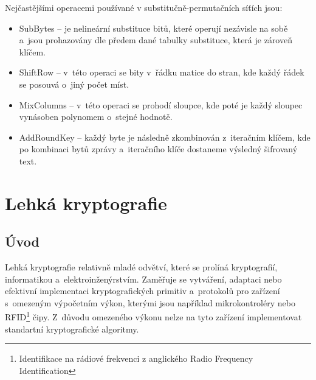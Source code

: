 Nejčastějšími operacemi používané v substitučně-permutačních síťích jsou:
\begin{itemize}
    \item SubBytes -- je nelineární substituce bitů, které operují nezávisle na sobě a~jsou prohazovány dle předem dané tabulky substituce, která je zároveň klíčem. 
    \item ShiftRow -- v~této operaci se bity v~řádku matice do stran, kde každý řádek se posouvá o~jiný počet míst.
    \item MixColumns -- v~této operaci se prohodí sloupce, kde poté je každý sloupec vynásoben polynomem o~stejné hodnotě.
    \item AddRoundKey -- každý byte je následně zkombinován z~iteračním klíčem, kde po kombinaci bytů zprávy a~iteračního klíče dostaneme výsledný šifrovaný text. 
\end{itemize}%
\null
\vfill

\chapter{Lehká kryptografie}
\section{Úvod}
Lehká kryptografie relativně mladé odvětví, které se prolíná kryptografií, informatikou  a~elektroinženýrstvím. Zaměřuje se vytváření, adaptaci nebo efektivní implementaci kryptografických primitiv a~protokolů pro zařízení s~omezeným výpočetním výkon, kterými jsou například mikrokontroléry nebo RFID\footnote{Identifikace na rádiové frekvenci z anglického Radio Frequency Identification} čipy. Z~důvodu omezeného výkonu nelze na tyto zařízení implementovat standartní kryptografické algoritmy.\cite{PoschmannCrypto}


